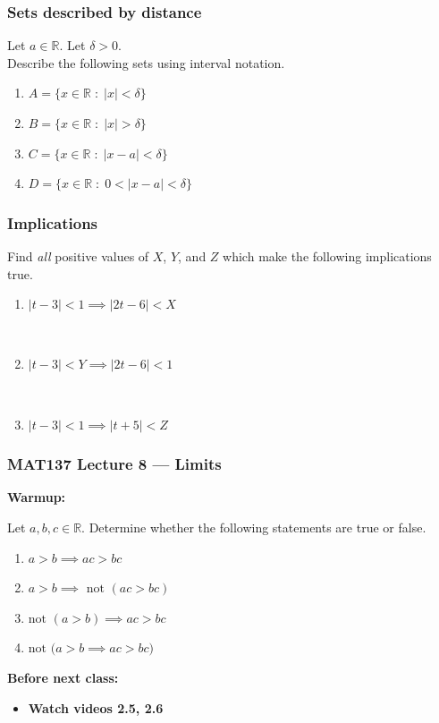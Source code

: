 \documentclass[14pt]{beamer}
\newcommand {\DS} [1] {${\displaystyle #1}$}
\newcommand {\R}{\mathbb{R}}
\begin{document}
\begin{frame}
\frametitle{Sets described by distance}


Let $a \in \R$.  Let $\delta >0$.  \\
Describe the following sets using interval notation.

\begin{enumerate}
	\item  \DS{A = \{x \in \R \; : \; |x| < \delta\} }
	\item  \DS{B = \{x \in \R \; : \; |x| > \delta\} }
	\item  \DS{C = \{x \in \R \; : \; |x-a| < \delta\} }
	\item  \DS{D = \{x \in \R \; : \; 0 < |x-a| < \delta\} }
\end{enumerate}


\end{frame}
\begin{frame}
\frametitle{Implications}

Find \emph{all} positive values of $X$, $Y$, and $Z$ which make the following implications true.

\vfill
\begin{enumerate}
	\item  \DS{| t-3 | <  1  \implies |2t-6| < X}
	
		\

	\item   \DS{|t-3| < Y \implies |2t-6| < 1}

		\

	\item  \DS{|t-3| < 1 \implies |t+5| < Z}
\end{enumerate}
\vfill

\end{frame}


\begin{frame}
\frametitle{MAT137 Lecture 8 --- Limits}
	{\bf Warmup:}

	Let $a,b,c\in \mathbb R$. Determine whether the following statements are true or false.
	\begin{enumerate}
		\item $a>b\implies ac > bc$
		\item $a>b\implies\text{ not }(ac>bc)$
		\item $\text{not }(a>b)\implies ac>bc$
		\item $\text{not }\Big(a>b\implies ac>bc\Big)$
	\end{enumerate}

	\vfill
	{\bf Before next class:}
		\begin{itemize} \normalsize
			\item {\bf Watch videos 2.5, 2.6 }
		\end{itemize}
	\vfill

\end{frame}
\end{document}
